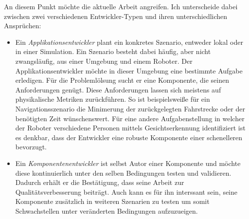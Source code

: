 An diesem Punkt möchte die aktuelle Arbeit angreifen. Ich unterscheide dabei zwischen zwei verschiedenen Entwickler-Typen und ihren unterschiedlichen Ansprüchen: \begin{itemize}
\item Ein \emph{Applikationsentwickler} plant ein konkretes Szenario, entweder lokal oder in einer Simulation. Ein Szenario besteht dabei häufig, aber nicht zwangsläufig, aus einer Umgebung und einem Roboter. Der Applikationsentwickler möchte in dieser Umgebung eine bestimmte Aufgabe erledigen. Für die Problemlölsung sucht er eine Komponente, die seinen Anforderungen genügt. Diese Anforderungen lassen sich meistens auf physikalische Metriken zurückführen. So ist beispielsweiße für ein Navigationsszenario die Minimerung der zurückgelegten Fahrstrecke oder der benötigten Zeit wünschenswert. Für eine andere Aufgabenstellung in welcher der Roboter verschiedene Personen mittels Gesichtserkennung identifiziert ist es denkbar, dass der Entwickler eine robuste Komponente einer schenelleren bevorzugt.

\item Ein \emph{Komponentenentwickler} ist selbst Autor einer Komponente und möchte diese kontinuierlich unter den selben Bedingungen testen und validieren. Dadurch erhält er die Bestätigung, dass seine Arbeit zur Qualitätsverbesserung beiträgt. Auch kann es für ihn interssant sein, seine Komponente zusätzlich in weiteren Szenarien zu testen um somit Schwachstellen unter veränderten Bedingungen aufzuzueigen.

\end{itemize}
